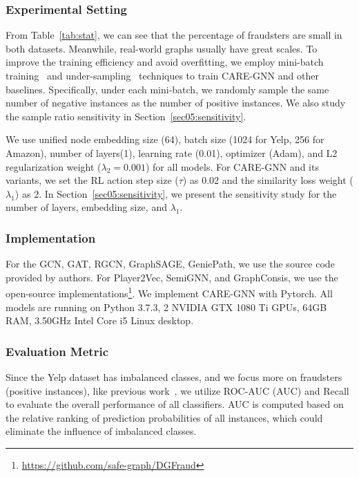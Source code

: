 \subsubsection{Experimental Setting}
\label{sec05:experimental_setting}
From Table~\ref{tab:stat}, we can see that the percentage of fraudsters are small in both datasets.
Meanwhile, real-world graphs usually have great scales.
To improve the training efficiency and avoid overfitting, we employ mini-batch training~\cite{goyal2017accurate} and under-sampling~\cite{liu2008exploratory} techniques to train CARE-GNN and other baselines.
Specifically, under each mini-batch, we randomly sample the same number of negative instances as the number of positive instances.
We also study the sample ratio sensitivity in Section~\ref{sec05:sensitivity}.

We use unified node embedding size (64), batch size (1024 for Yelp, 256 for Amazon), number of layers(1), learning rate (0.01), optimizer (Adam), and L2 regularization weight ($\lambda_2=0.001$) for all models.
For CARE-GNN and its variants, we set the RL action step size ($\tau$) as 0.02 and the similarity loss weight ($\lambda_1$) as 2.
In Section~\ref{sec05:sensitivity}, we present the sensitivity study for the number of layers, embedding size, and $\lambda_1$.   

\subsubsection{Implementation}
For the GCN, GAT, RGCN, GraphSAGE, GeniePath, we use the source code provided by authors.
For Player2Vec, SemiGNN, and GraphConsis, we use the open-source implementations\footnote{\url{https://github.com/safe-graph/DGFraud}}.
We implement CARE-GNN with Pytorch. All models are running on Python 3.7.3, 2 NVIDIA GTX 1080 Ti GPUs, 64GB RAM, 3.50GHz Intel Core i5 Linux desktop.

\subsubsection{Evaluation Metric}
Since the Yelp dataset has imbalanced classes, and we focus more on fraudsters (positive instances),
like previous work~\cite{Rayana2015}, we utilize ROC-AUC (AUC) and Recall to evaluate the overall performance of all classifiers.
AUC is computed based on the relative ranking of prediction probabilities of all instances, which could eliminate the influence of imbalanced classes.


